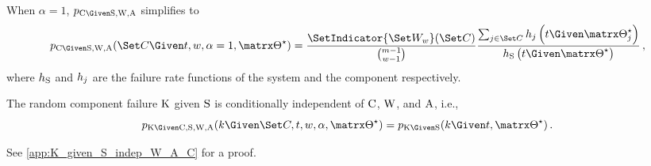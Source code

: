 \documentclass[../main.tex]{subfiles}
\begin{document}
\begin{corollary}
\label{def:general_cond_cand_probability}
When $\alpha=1$, $\pmf_{\rvcand \Given \sv, \RV{W}, \RV{A}}$ simplifies to 
\begin{equation}
\label{eq:general_cond_cand_probability}
\pmf_{\rvcand \Given \sv, \RV{W}, \RV{A}}(\cand \Given t, w, \alpha=1, \tparam\sysparam) =
\frac{\SetIndicator{\candsw{w}}(\cand)}{\binom{m-1}{w-1}}
\frac
{
	\sum_{j \in \cand} \haz_j\left(t \Given \tparam\sysparam_j\right)
}
{
	\haz_{\sv}\left(t \Given \tparam\sysparam\right)
}\,,
\end{equation}
where $h_{\mathrm{S}}$ and $h_j$ are the failure rate functions of the system 
and the \jth component respectively.
\end{corollary}




\begin{corollary}
\label{cor:K_given_S_indep_W_A_C}
The random component failure $\mathrm{K}$ given $\mathrm{S}$ is conditionally independent of $\mathrm{C}$, $\mathrm{W}$, and $\mathrm{A}$, i.e.,
\begin{equation}
	\pmf_{\RV{K} \Given \rvcand, \sv, \RV{W}, \RV{A}}(k \Given \cand, t, w, \alpha, \tparam\sysparam) = \pmf_{\RV{K} \Given \sv}(k \Given t, \tparam\sysparam)\,.
\end{equation}
\end{corollary}
See \cref{app:K_given_S_indep_W_A_C} for a proof.
\end{document}
